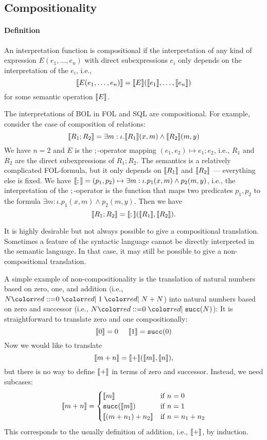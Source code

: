 \subsection{Compositionality}

\paragraph{Definition}
An interpretation function is compositional if the interpretation of any kind of expression $E(e_1,\ldots,e_n)$ with direct subexpressions $e_i$ only depends on the interpretation of the $e_i$, i.e., \[\llbracket E(e_1,\ldots,e_n)\rrbracket=\llbracket E\rrbracket(\llbracket e_1\rrbracket,\ldots,\llbracket e_n\rrbracket)\] for some semantic operation $\llbracket E\rrbracket$.

The interpretations of BOL in FOL and SQL are compositional.
For example, consider the case of composition of relations:
 \[\llbracket R_1 ; R_2\rrbracket= \exists m:\iota.\llbracket R_1\rrbracket(x,m)\wedge \llbracket R_2\rrbracket(m,y)\]
We have $n=2$ and $E$ is the $;$-operator mapping $(e_1,e_2)\mapsto e_1;e_2$, i.e., $R_1$ and $R_2$ are the direct subexpressions of $R_1;R_2$.
The semantics is a relatively complicated FOL-formula, but it only depends on $\llbracket R_1\rrbracket$ and $\llbracket R_2\rrbracket$ --- everything else is fixed.
We have $\llbracket ;\rrbracket=(p_1,p_2)\mapsto \exists m:\iota.p_1(x,m)\wedge p_2(m,y)$, i.e., the interpretation of the $;$-operator is the function that maps two predicates $p_1,p_2$ to the formula $\exists m:\iota.p_1(x,m)\wedge p_2(m,y)$.
Then we have \[\llbracket R_1;R_2\rrbracket=\llbracket ;\rrbracket(\llbracket R_1\rrbracket,\llbracket R_2\rrbracket).\]


It is highly desirable but not always possible to give a compositional translation.
Sometimes a feature of the syntactic language cannot be directly interpreted in the semantic language.
In that case, it may still be possible to give a non-compositional translation.

\begin{example}
A simple example of non-compositionality is the translation of natural numbers based on zero, one, and addition (i.e., $N\bbc 0\bnfalt 1\bnfalt N+N$) into natural numbers based on zero and successor (i.e., $N\bbc 0\bnfalt\cn{succ}(N)$):
It is straightforward to translate zero and one compositionally:
\[\llbracket 0\rrbracket=0 \hspace*{.5cm}\llbracket 1\rrbracket=\mathtt{succ}(0)\]
Now we would like to translate \[\llbracket m+n\rrbracket=\llbracket +\rrbracket(\llbracket m\rrbracket,\llbracket n\rrbracket),\] but there is no way to define $\llbracket +\rrbracket$ in terms of zero and successor.
Instead, we need subcases:
\[\llbracket m+n\rrbracket=\begin{cases}\llbracket m\rrbracket&\mathrm{if}\; n=0 \\ \mathtt{succ}(\llbracket m\rrbracket)&\mathrm{if}\; n=1 \\ \llbracket (m+n_1)+n_2\rrbracket&\mathrm{if}\; n=n_1+n_2\end{cases}\]
This corresponds to the usually definition of addition, i.e., $\llbracket +\rrbracket$, by induction.
\end{example}

